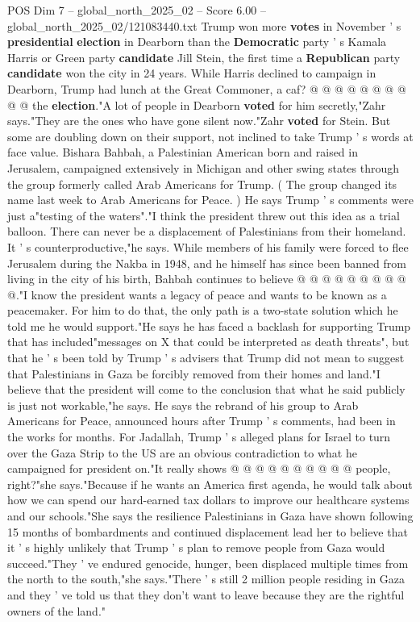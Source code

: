 \begin{textsample}{POS Dim 7 – global\_north\_2025\_02 – Score 6.00 – global\_north\_2025\_02/121083440.txt}
Trump won more \textbf{votes} in November ' s \textbf{presidential} \textbf{election} in Dearborn than the \textbf{Democratic} party ' s Kamala Harris or Green party \textbf{candidate} Jill Stein, the first time a \textbf{Republican} party \textbf{candidate} won the city in 24 years.
While Harris declined to campaign in Dearborn, Trump had lunch at the Great Commoner, a caf? @ @ @ @ @ @ @ @ @ @ the \textbf{election}."A lot of people in Dearborn \textbf{voted} for him secretly,"Zahr says."They are the ones who have gone silent now."Zahr \textbf{voted} for Stein.
But some are doubling down on their support, not inclined to take Trump ' s words at face value.
Bishara Bahbah, a Palestinian American born and raised in Jerusalem, campaigned extensively in Michigan and other swing states through the group formerly called Arab Americans for Trump. ( The group changed its name last week to Arab Americans for Peace. ) He says Trump ' s comments were just a"testing of the waters"."I think the president threw out this idea as a trial balloon.
There can never be a displacement of Palestinians from their homeland.
It ' s counterproductive,"he says.
While members of his family were forced to flee Jerusalem during the Nakba in 1948, and he himself has since been banned from living in the city of his birth, Bahbah continues to believe @ @ @ @ @ @ @ @ @ @."I know the president wants a legacy of peace and wants to be known as a peacemaker.
For him to do that, the only path is a two-state solution which he told me he would support."He says he has faced a backlash for supporting Trump that has included"messages on X that could be interpreted as death threats", but that he ' s been told by Trump ' s advisers that Trump did not mean to suggest that Palestinians in Gaza be forcibly removed from their homes and land."I believe that the president will come to the conclusion that what he said publicly is just not workable,"he says.
He says the rebrand of his group to Arab Americans for Peace, announced hours after Trump ' s comments, had been in the works for months.
For Jadallah, Trump ' s alleged plans for Israel to turn over the Gaza Strip to the US are an obvious contradiction to what he campaigned for president on."It really shows @ @ @ @ @ @ @ @ @ @ people, right?"she says."Because if he wants an America first agenda, he would talk about how we can spend our hard-earned tax dollars to improve our healthcare systems and our schools."She says the resilience Palestinians in Gaza have shown following 15 months of bombardments and continued displacement lead her to believe that it ' s highly unlikely that Trump ' s plan to remove people from Gaza would succeed."They ' ve endured genocide, hunger, been displaced multiple times from the north to the south,"she says."There ' s still 2 million people residing in Gaza and they ' ve told us that they don't want to leave because they are the rightful owners of the land."

\end{textsample}
